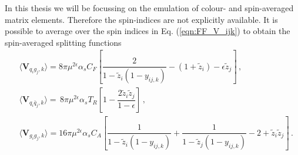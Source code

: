 \documentclass[main.tex]{subfiles}
\begin{document}
        In this thesis we will be focussing on the emulation of
        colour- and spin-averaged matrix elements. Therefore the spin-indices
        are not explicitly available. It is possible to average over the spin
        indices in Eq. (\ref{eqn:FF_V_ijk})
        to obtain the spin-averaged splitting functions
        \begin{align}\label{eqn:FF_avg_V_ijk}
            &\langle \boldsymbol{V}_{q_{i}g_{j},k} \rangle = 8\pi \mu^{2\epsilon} \alpha_{s} C_{F} \left[\dfrac{2}{1-\tilde{z}_{i}(1-y_{ij,k})} - (1+\tilde{z}_{i}) - \epsilon \tilde{z}_{j} \right] \, , \nonumber \\
            &\langle \boldsymbol{V}_{q_{i}\bar{q}_{j},k} \rangle = \, 8\pi \mu^{2\epsilon} \alpha_{s} T_{R} \left[1-\dfrac{2\tilde{z}_{i}\tilde{z}_{j}}{1-\epsilon}\right] \, , \nonumber \\
            &\langle \boldsymbol{V}_{g_{i}g_{j},k} \rangle = 16\pi \mu^{2\epsilon} \alpha_{s} C_{A} \left[\dfrac{1}{1-\tilde{z}_{i}(1-y_{ij,k})}+\dfrac{1}{1-\tilde{z}_{j}(1-y_{ij,k})}-2+\tilde{z}_{i}\tilde{z}_{j}\right] \, .
        \end{align}
\end{document}
